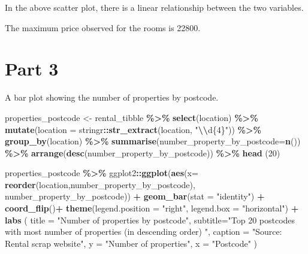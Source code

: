 \documentclass[
]{article}
\newenvironment{Shaded}{\begin{snugshade}}{\end{snugshade}}
\newcommand{\AttributeTok}[1]{\textcolor[rgb]{0.13,0.29,0.53}{#1}}
\newcommand{\DecValTok}[1]{\textcolor[rgb]{0.00,0.00,0.81}{#1}}
\newcommand{\FunctionTok}[1]{\textcolor[rgb]{0.13,0.29,0.53}{\textbf{#1}}}
\newcommand{\NormalTok}[1]{#1}
\newcommand{\OtherTok}[1]{\textcolor[rgb]{0.56,0.35,0.01}{#1}}
\newcommand{\SpecialCharTok}[1]{\textcolor[rgb]{0.81,0.36,0.00}{\textbf{#1}}}
\newcommand{\StringTok}[1]{\textcolor[rgb]{0.31,0.60,0.02}{#1}}
\begin{document}
In the above scatter plot, there is a linear relationship between the
two variables.

The maximum price observed for the rooms is 22800.

\hypertarget{part-3}{%
\section{Part 3}\label{part-3}}

A bar plot showing the number of properties by postcode.

\begin{Shaded}
\begin{Highlighting}[]
\NormalTok{properties\_postcode }\OtherTok{\textless{}{-}}\NormalTok{ rental\_tibble }\SpecialCharTok{\%\textgreater{}\%}
  \FunctionTok{select}\NormalTok{(location) }\SpecialCharTok{\%\textgreater{}\%}
  \FunctionTok{mutate}\NormalTok{(}\AttributeTok{location =}\NormalTok{ stringr}\SpecialCharTok{::}\FunctionTok{str\_extract}\NormalTok{(location, }\StringTok{"}\SpecialCharTok{\textbackslash{}\textbackslash{}}\StringTok{d\{4\}"}\NormalTok{)) }\SpecialCharTok{\%\textgreater{}\%}
  \FunctionTok{group\_by}\NormalTok{(location) }\SpecialCharTok{\%\textgreater{}\%}
  \FunctionTok{summarise}\NormalTok{(}\AttributeTok{number\_property\_by\_postcode=}\FunctionTok{n}\NormalTok{()) }\SpecialCharTok{\%\textgreater{}\%}
  \FunctionTok{arrange}\NormalTok{(}\FunctionTok{desc}\NormalTok{(number\_property\_by\_postcode)) }\SpecialCharTok{\%\textgreater{}\%} 
  \FunctionTok{head}\NormalTok{ (}\DecValTok{20}\NormalTok{)}

\NormalTok{properties\_postcode }\SpecialCharTok{\%\textgreater{}\%}\NormalTok{ ggplot2}\SpecialCharTok{::}\FunctionTok{ggplot}\NormalTok{(}\FunctionTok{aes}\NormalTok{(}\AttributeTok{x=} \FunctionTok{reorder}\NormalTok{(location,number\_property\_by\_postcode), number\_property\_by\_postcode)) }\SpecialCharTok{+}
  \FunctionTok{geom\_bar}\NormalTok{(}\AttributeTok{stat =} \StringTok{"identity"}\NormalTok{) }\SpecialCharTok{+} \FunctionTok{coord\_flip}\NormalTok{()}\SpecialCharTok{+}
  \FunctionTok{theme}\NormalTok{(}\AttributeTok{legend.position =} \StringTok{"right"}\NormalTok{, }\AttributeTok{legend.box =} \StringTok{"horizontal"}\NormalTok{) }\SpecialCharTok{+}
  \FunctionTok{labs}\NormalTok{ (}
    \AttributeTok{title =} \StringTok{"Number of properties by postcode"}\NormalTok{,}
    \AttributeTok{subtitle=}\StringTok{"Top 20 postcodes with most number of properties (in descending order) "}\NormalTok{,}
    \AttributeTok{caption =} \StringTok{"Source: Rental scrap website"}\NormalTok{,}
    \AttributeTok{y =} \StringTok{"Number of properties"}\NormalTok{,}
    \AttributeTok{x =} \StringTok{"Postcode"}
\NormalTok{  )}
\end{Highlighting}
\end{Shaded}
\end{document}
